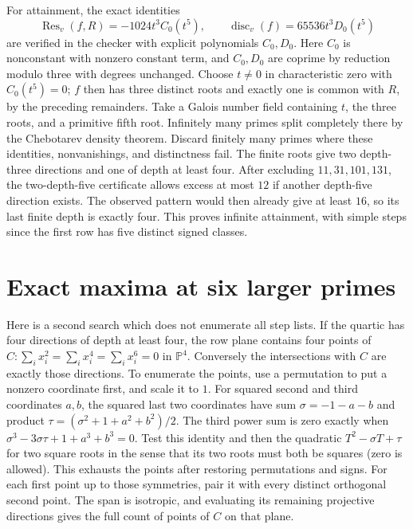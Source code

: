 \documentclass[11pt]{article}
\begin{document}
For attainment, the exact identities
\[
 \operatorname{Res}_v(f,R)=-1024t^3C_0(t^5),\qquad
 \operatorname{disc}_v(f)=65536t^3D_0(t^5)
\]
are verified in the checker with explicit polynomials $C_0,D_0$.
Here $C_0$ is nonconstant with nonzero constant term, and
$C_0,D_0$ are coprime by reduction modulo three with degrees
unchanged. Choose $t\ne0$ in characteristic zero with
$C_0(t^5)=0$; $f$ then has three distinct roots and exactly one
is common with $R$, by the preceding remainders.
Take a Galois number field containing $t$, the three roots, and
a primitive fifth root. Infinitely many primes split completely
there by the Chebotarev density theorem. Discard finitely many
primes where these identities, nonvanishings, and distinctness
fail. The finite roots give two depth-three directions and one
of depth at least four. After excluding $11,31,101,131$, the
two-depth-five certificate allows excess at most $12$ if
another depth-five direction exists. The observed pattern would
then already give at least $16$, so its last finite depth is
exactly four. This proves infinite attainment, with simple
steps since the first row has five distinct signed classes.

\section{Exact maxima at six larger primes}
Here is a second search which does not enumerate all step lists.
If the quartic has four directions of depth at least four,
the row plane contains four points of
$C:\sum_i x_i^2=\sum_i x_i^4=\sum_i x_i^6=0$ in $\mathbb P^4$.
Conversely the intersections with $C$ are exactly those
directions. To enumerate the points, use a permutation to put
a nonzero coordinate first, and scale it to $1$. For squared
second and third coordinates $a,b$, the squared last two
coordinates have sum $\sigma=-1-a-b$ and product
$\tau=(\sigma^2+1+a^2+b^2)/2$. The third power sum is zero exactly
when $\sigma^3-3\sigma\tau+1+a^3+b^3=0$. Test this identity and then
the quadratic $T^2-\sigma T+\tau$ for two square roots in the sense
that its two roots must both be squares (zero is allowed).
This exhausts the points after restoring permutations and signs.
For each first point up to those symmetries, pair it with every
distinct orthogonal second point. The span is isotropic, and
evaluating its remaining projective directions gives the full
count of points of $C$ on that plane.
\end{document}

